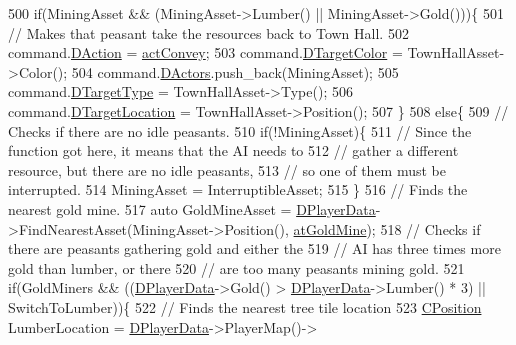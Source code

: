 \begin{DoxyCode}
500         \textcolor{keywordflow}{if}(MiningAsset && (MiningAsset->Lumber() || MiningAsset->Gold()))\{
501             \textcolor{comment}{// Makes that peasant take the resources back to Town Hall.}
502             command.\hyperlink{structSPlayerCommandRequest_a80897bbccf2c4e0b148a7aa815a926c6}{DAction} = \hyperlink{GameDataTypes_8h_a35b98ce26aca678b03c6f9f76e4778cead52ccba78becf1f7411bcea19f1276a8}{actConvey};
503             command.\hyperlink{structSPlayerCommandRequest_a3690a5117efe6214d92f18d672b5714f}{DTargetColor} = TownHallAsset->Color();
504             command.\hyperlink{structSPlayerCommandRequest_aa37fc01519676345703d78b9f573894a}{DActors}.push\_back(MiningAsset);
505             command.\hyperlink{structSPlayerCommandRequest_a864e47c641127665751091876a6d3c5e}{DTargetType} = TownHallAsset->Type();
506             command.\hyperlink{structSPlayerCommandRequest_a701702b94ca2fd2738e95ef6711dd41a}{DTargetLocation} = TownHallAsset->Position();
507         \}
508         \textcolor{keywordflow}{else}\{
509             \textcolor{comment}{// Checks if there are no idle peasants.}
510             \textcolor{keywordflow}{if}(!MiningAsset)\{
511                 \textcolor{comment}{// Since the function got here, it means that the AI needs to }
512                 \textcolor{comment}{// gather a different resource, but there are no idle peasants,}
513                 \textcolor{comment}{// so one of them must be interrupted.}
514                 MiningAsset = InterruptibleAsset;   
515             \}
516             \textcolor{comment}{// Finds the nearest gold mine.}
517             \textcolor{keyword}{auto} GoldMineAsset = \hyperlink{classCAIPlayer_a83b5113c8f7e80df54940b647c5ee2e6}{DPlayerData}->FindNearestAsset(MiningAsset->Position(), 
      \hyperlink{GameDataTypes_8h_a5600d4fc433b83300308921974477feca243d9ba44092eadd561db058d742b3b3}{atGoldMine});
518             \textcolor{comment}{// Checks if there are peasants gathering gold and either the }
519             \textcolor{comment}{// AI has three times more gold than lumber, or there }
520             \textcolor{comment}{// are too many peasants mining gold.}
521             \textcolor{keywordflow}{if}(GoldMiners && ((\hyperlink{classCAIPlayer_a83b5113c8f7e80df54940b647c5ee2e6}{DPlayerData}->Gold() > \hyperlink{classCAIPlayer_a83b5113c8f7e80df54940b647c5ee2e6}{DPlayerData}->Lumber() * 3) || 
      SwitchToLumber))\{
522                 \textcolor{comment}{// Finds the nearest tree tile location}
523                 \hyperlink{classCPosition}{CPosition} LumberLocation = \hyperlink{classCAIPlayer_a83b5113c8f7e80df54940b647c5ee2e6}{DPlayerData}->PlayerMap()->

\end{DoxyCode}
